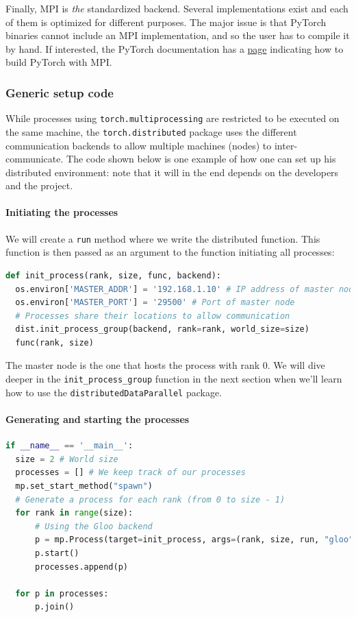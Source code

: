 \documentclass{article}
\begin{document}
Finally, MPI is \textit{the} standardized backend. Several implementations exist and each of them is optimized for different purposes. The major issue is that PyTorch binaries cannot include an MPI implementation, and so the user has to compile it by hand. If interested, the PyTorch documentation has a \href{https://pytorch.org/tutorials/intermediate/dist_tuto.html#communication-backends}{page} indicating how to build PyTorch with MPI.

\subsubsection{Generic setup code}
While processes using \lstinline{torch.multiprocessing} are restricted to be executed on the same machine, the \lstinline{torch.distributed} package uses the different communication backends to allow multiple machines (nodes) to inter-communicate. The  code shown below is one example of how one can set up his distributed environment: note that it will in the end depends on the developers and the project.

\paragraph{Initiating the processes}
We will create a \lstinline{run} method where we write the distributed function. This function is then passed as an argument to the function initiating all processes:

\begin{lstlisting}[language=Python]
def init_process(rank, size, func, backend):
  os.environ['MASTER_ADDR'] = '192.168.1.10' # IP address of master node
  os.environ['MASTER_PORT'] = '29500' # Port of master node
  # Processes share their locations to allow communication
  dist.init_process_group(backend, rank=rank, world_size=size)
  func(rank, size)
\end{lstlisting}

The master node is the one that hosts the process with rank 0. We will dive deeper in the \lstinline{init_process_group} function in the next section when we'll learn how to use the \lstinline{distributedDataParallel} package.

\paragraph{Generating and starting the processes}
\begin{lstlisting}[language=Python]
if __name__ == '__main__':
  size = 2 # World size
  processes = [] # We keep track of our processes
  mp.set_start_method("spawn")
  # Generate a process for each rank (from 0 to size - 1)
  for rank in range(size):
      # Using the Gloo backend
      p = mp.Process(target=init_process, args=(rank, size, run, "gloo"))
      p.start()
      processes.append(p)

  for p in processes:
      p.join()
\end{lstlisting}
\end{document}
